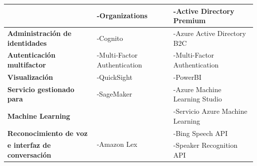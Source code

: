 \begin{table}[H]
{\begin{tabular}{|l|l|l|}
\textbf{} & -Organizations & -Active Directory Premium \\ \hline
\textbf{Administración   de identidades} & -Cognito & -Azure Active   Directory B2C \\ \hline
\multirow{2}{*}{\textbf{Autenticación multifactor}} & \multirow{2}{*}{-Multi-Factor Authentication} & \multirow{2}{*}{-Multi-Factor Authentication} \\
 &  &  \\ \hline
\textbf{Visualización} & -QuickSight & -PowerBI \\ \hline
\textbf{Servicio gestionado para} & -SageMaker & -Azure Machine Learning Studio \\
\textbf{Machine Learning} &  & -Servicio Azure Machine Learning \\ \hline
\textbf{Reconocimiento de voz} & \multirow{2}{*}{-Amazon Lex} & -Bing Speech API \\
\textbf{e interfaz de conversación} &  & -Speaker Recognition API \\ \hline
\end{tabular}%
}
\label{tab7-1}
\end{table}

\newpage

